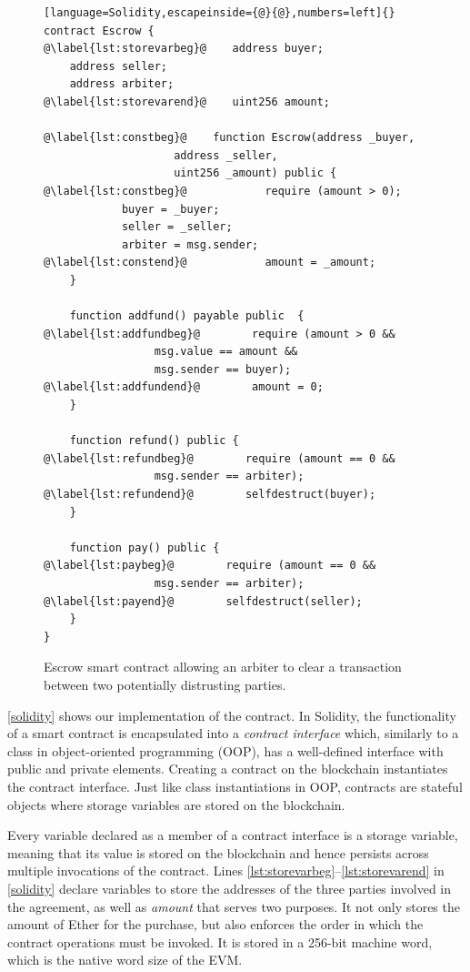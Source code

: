 \documentclass[sigplan,10pt]{acmart}\settopmatter{printfolios=true,printccs=false,printacmref=false}
\begin{document}
\begin{figure}[h!]
\begin{lstlisting}[language=Solidity,escapeinside={@}{@},numbers=left]{}
contract Escrow {
@\label{lst:storevarbeg}@    address buyer;
    address seller;
    address arbiter;
@\label{lst:storevarend}@    uint256 amount;

@\label{lst:constbeg}@    function Escrow(address _buyer,
                    address _seller,
                    uint256 _amount) public {
@\label{lst:constbeg}@            require (amount > 0);
            buyer = _buyer;
            seller = _seller;
            arbiter = msg.sender;
@\label{lst:constend}@            amount = _amount;
    }

    function addfund() payable public  {
@\label{lst:addfundbeg}@        require (amount > 0 &&
                 msg.value == amount &&
                 msg.sender == buyer);
@\label{lst:addfundend}@        amount = 0;
    }

    function refund() public {
@\label{lst:refundbeg}@        require (amount == 0 &&
                 msg.sender == arbiter);
@\label{lst:refundend}@        selfdestruct(buyer);
    }

    function pay() public {
@\label{lst:paybeg}@        require (amount == 0 &&
                 msg.sender == arbiter);
@\label{lst:payend}@        selfdestruct(seller);
    }
}
\end{lstlisting}
\caption{Escrow smart contract allowing an arbiter to clear a
 transaction between two potentially distrusting parties.}
\label{solidity}
\end{figure}

\autoref{solidity} shows our implementation of the contract.
In Solidity, the functionality of a smart contract is encapsulated into a
\textit{contract interface} which, similarly to a class in object-oriented programming
(OOP), has a well-defined interface with public and private elements.
Creating a contract on the blockchain instantiates the contract interface.
Just like class instantiations in OOP, contracts are stateful objects
where storage variables are stored on the blockchain.

Every variable declared as a member of a contract interface is
a storage variable, meaning that its value is stored on the blockchain 
and hence persists across multiple invocations of the contract.
Lines \autoref{lst:storevarbeg}--\autoref{lst:storevarend} in \autoref{solidity}
declare variables to store the addresses of the three parties
involved in the agreement, as well as \textit{amount} that serves two purposes.
It not only stores
the amount of Ether for the purchase, but also enforces the order
in which the contract operations must be invoked.
It is stored in a 256-bit machine word, which is the
native word size of the EVM.
\end{document}

